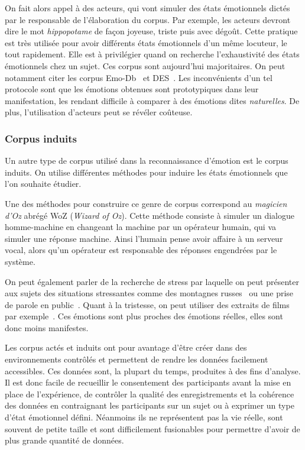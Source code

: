 On fait alors appel à des acteurs, qui vont simuler des états émotionnels dictés par le responsable de l'élaboration du corpus. Par exemple, les acteurs devront dire le mot \textit{hippopotame} de façon joyeuse, triste puis avec dégoût. Cette pratique est très utilisée pour avoir différents états émotionnels d'un même locuteur, le tout rapidement. Elle est à privilégier quand on recherche l'exhaustivité des états émotionnels chez un sujet. Ces corpus sont aujourd'hui majoritaires. On peut notamment citer les corpus Emo-Db~\cite{Burkhardt2005} et DES~\cite{Engberg1997}. Les inconvénients d'un tel protocole sont que les émotions obtenues sont prototypiques dans leur manifestation, les rendant difficile à comparer à des émotions dites \textit{naturelles}. De plus, l'utilisation d'acteurs peut se révéler coûteuse.

\subsubsection{Corpus induits}
Un autre type de corpus utilisé dans la reconnaissance d'émotion est le corpus induits. On utilise différentes méthodes pour induire les états émotionnels que l'on souhaite étudier.

Une des méthodes pour construire ce genre de corpus correspond au \textit{magicien d'Oz} abrégé WoZ (\textit{Wizard of Oz}). Cette méthode consiste à simuler un dialogue homme-machine en changeant la machine par un opérateur humain, qui va simuler une réponse machine. Ainsi l'humain pense avoir affaire à un serveur vocal, alors qu'un opérateur est responsable des réponses engendrées par le système.

On peut également parler de la recherche de stress par laquelle on peut présenter aux sujets des situations stressantes comme des montagnes russes~\cite{Hansen1997} ou une prise de parole en public~\cite{Giraud2013}. Quant à la tristesse, on peut utiliser des extraits de films par exemple~\cite{Schuller2010cinemo}. Ces émotions sont plus proches des émotions réelles, elles sont donc moins manifestes.

Les corpus actés et induits ont pour avantage d'être créer dans des environnements contrôlés et permettent de rendre les données facilement accessibles. Ces données sont, la plupart du temps, produites à des fins d'analyse. Il est donc facile de recueillir le consentement des participants avant la mise en place de l'expérience, de contrôler la qualité des enregistrements et la cohérence des données en contraignant les participants sur un sujet ou à exprimer un type d'état émotionnel défini. Néanmoins ils ne représentent pas la vie réelle, sont souvent de petite taille et sont difficilement fusionables pour permettre d'avoir de plus grande quantité de données.

